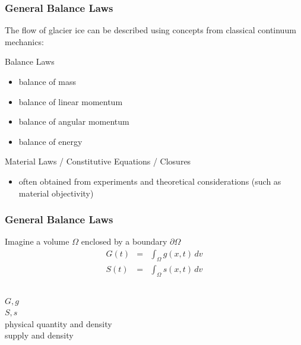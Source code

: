 \documentclass[hide notes,intlimits]{beamer}
\begin{document}

\begin{frame}
  \frametitle{General Balance Laws}
  The flow of glacier ice can be described using concepts from classical continuum mechanics:
  \begin{block}{Balance Laws}
    \begin{itemize}
    \item balance of mass
    \item balance of linear momentum
    \item balance of angular momentum
    \item balance of energy
    \end{itemize}
  \end{block}
  \begin{block}{Material Laws / Constitutive Equations / Closures}
    \begin{itemize}
      \item often obtained from experiments and theoretical considerations (such as material objectivity)
   \end{itemize}
  \end{block}
\end{frame}


\begin{frame}
  \frametitle{General Balance Laws}
  Imagine a volume $\Omega$ enclosed by a boundary $\partial \Omega$
   \begin{eqnarray}
      G(t) &=& \int_{\Omega} g(x,t)\,d v \\
      S(t) &=& \int_{\Omega} s(x,t)\,d v
    \end{eqnarray}
    \begin{columns}
      \column[C]{0.1cm}
      $G,g$ \\
      $S,s$ \\
     \column[C]{6cm}
      physical quantity and density\\
      supply and density \\
   \end{columns}
\end{frame}
\end{document}
